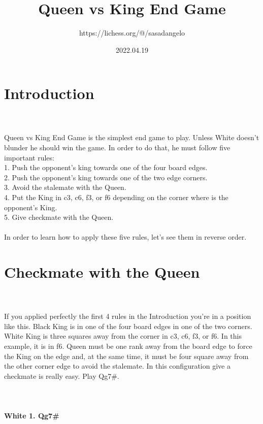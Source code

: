 \documentclass{article}
\title{Queen vs King End Game}
\author{https://lichess.org/@/sasadangelo}
\date{2022.04.19}
\begin{document}
\begin{titlepage}
\maketitle
\end{titlepage}
\section{ Introduction}

\\
\\
Queen vs King End Game is the simplest end game to play. Unless White doesn't blunder he should win the game. In order to do that, he must follow five important rules:\\1. Push the opponent's king towards one of the four board edges.\\2. Push the opponent's king towards one of the two edge corners.\\3. Avoid the stalemate with the Queen.\\4. Put the King in c3, c6, f3, or f6 depending on the corner where is the opponent's King.\\5. Give checkmate with the Queen.\\\\In order to learn how to apply these five rules, let's see them in reverse order.\section{ Checkmate with the Queen}

\\
\\
If you applied perfectly the first 4 rules in the Introduction you're in a position like this. Black King is in one of the four board edges in one of the two corners. White King is three squares away from the corner in c3, c6, f3, or f6. In this example, it is in f6. Queen must be one rank away from the board edge to force the King on the edge and, at the same time, it must be four square away from the other corner edge to avoid the stalemate. In this configuration give a checkmate is really easy. Play Qg7\#.\\\\

\\
\\
\textbf{White 1. Qg7\#}\\
\end{document}
